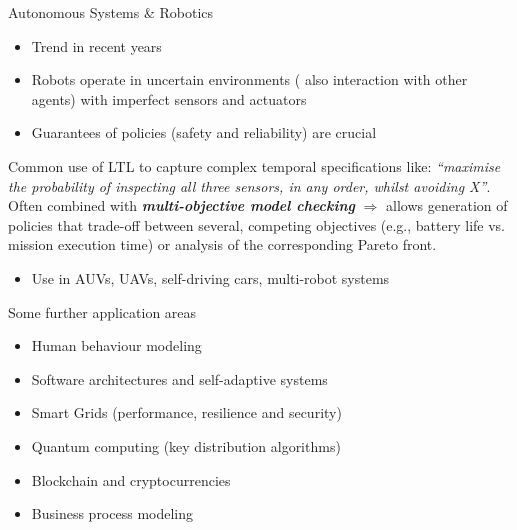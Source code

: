 \documentclass[dvipsnames]{beamer}
\begin{document}
\begin{frame}{Autonomous Systems \& Robotics}
    \begin{itemize}
        \item Trend in recent years
        \item Robots operate in uncertain environments ( also interaction with other agents) with imperfect
              sensors and actuators
        \item Guarantees of policies (safety and reliability) are crucial
    \end{itemize}
    Common use of LTL to capture complex temporal specifications like: {\textit{“maximise the probability of inspecting all three sensors, in any order,
        whilst avoiding X”}}.\\
    Often combined with {\it \textbf{ multi-objective model checking}} $\Rightarrow$ allows generation of policies
    that trade-off between several, competing objectives (e.g., battery life vs. mission
    execution time) or analysis of the corresponding Pareto front.


    \begin{itemize}
        \item Use in AUVs, UAVs, self-driving cars, multi-robot systems
    \end{itemize}


\end{frame}



\begin{frame} {Some further application areas}
    \begin{itemize}
        \item Human behaviour modeling
        \item Software architectures and self-adaptive systems
        \item Smart Grids (performance, resilience and security)
        \item Quantum computing (key distribution algorithms)
        \item Blockchain and cryptocurrencies
        \item Business process modeling
    \end{itemize}

\end{frame}
\end{document}
